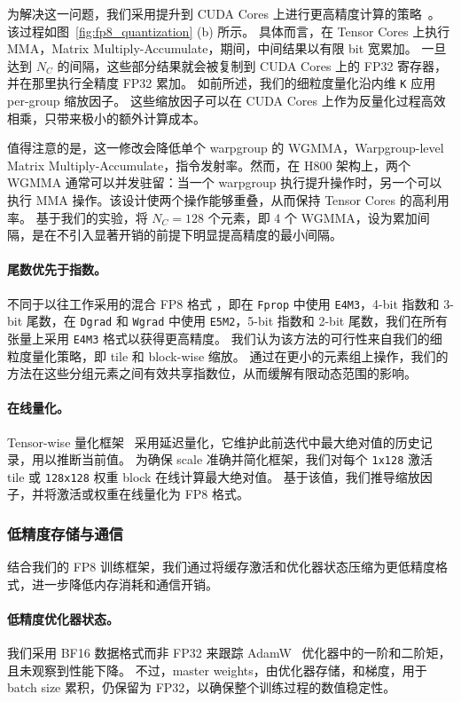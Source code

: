 为解决这一问题，我们采用提升到 CUDA Cores 上进行更高精度计算的策略~\citep{Thakkar_CUTLASS_2023}。
该过程如图~\ref{fig:fp8_quantization} (b) 所示。
具体而言，在 Tensor Cores 上执行 MMA，Matrix Multiply-Accumulate，期间，中间结果以有限 bit 宽累加。
一旦达到 $N_C$ 的间隔，这些部分结果就会被复制到 CUDA Cores 上的 FP32 寄存器，并在那里执行全精度 FP32 累加。
如前所述，我们的细粒度量化沿内维 \texttt{K} 应用 per-group 缩放因子。
这些缩放因子可以在 CUDA Cores 上作为反量化过程高效相乘，只带来极小的额外计算成本。

值得注意的是，这一修改会降低单个 warpgroup 的 WGMMA，Warpgroup-level Matrix Multiply-Accumulate，指令发射率。然而，在 H800 架构上，两个 WGMMA 通常可以并发驻留：当一个 warpgroup 执行提升操作时，另一个可以执行 MMA 操作。该设计使两个操作能够重叠，从而保持 Tensor Cores 的高利用率。
基于我们的实验，将 $N_C=128$ 个元素，即 4 个 WGMMA，设为累加间隔，是在不引入显著开销的前提下明显提高精度的最小间隔。

\paragraph{尾数优先于指数。}
不同于以往工作采用的混合 FP8 格式 \citep{transformerengine, fp8lm, hfp8}，即在 \texttt{Fprop} 中使用 \texttt{E4M3}，4-bit 指数和 3-bit 尾数，在 \texttt{Dgrad} 和 \texttt{Wgrad} 中使用 \texttt{E5M2}，5-bit 指数和 2-bit 尾数，我们在所有张量上采用 \texttt{E4M3} 格式以获得更高精度。
我们认为该方法的可行性来自我们的细粒度量化策略，即 tile 和 block-wise 缩放。
通过在更小的元素组上操作，我们的方法在这些分组元素之间有效共享指数位，从而缓解有限动态范围的影响。

\paragraph{在线量化。}
Tensor-wise 量化框架~\citep{transformerengine, fp8lm} 采用延迟量化，它维护此前迭代中最大绝对值的历史记录，用以推断当前值。
为确保 scale 准确并简化框架，我们对每个 \texttt{1x128} 激活 tile 或 \texttt{128x128} 权重 block 在线计算最大绝对值。
基于该值，我们推导缩放因子，并将激活或权重在线量化为 FP8 格式。

\subsubsection{低精度存储与通信}
结合我们的 FP8 训练框架，我们通过将缓存激活和优化器状态压缩为更低精度格式，进一步降低内存消耗和通信开销。

\paragraph{低精度优化器状态。}
我们采用 BF16 数据格式而非 FP32 来跟踪 AdamW~\citep{adamW} 优化器中的一阶和二阶矩，且未观察到性能下降。
不过，master weights，由优化器存储，和梯度，用于 batch size 累积，仍保留为 FP32，以确保整个训练过程的数值稳定性。

